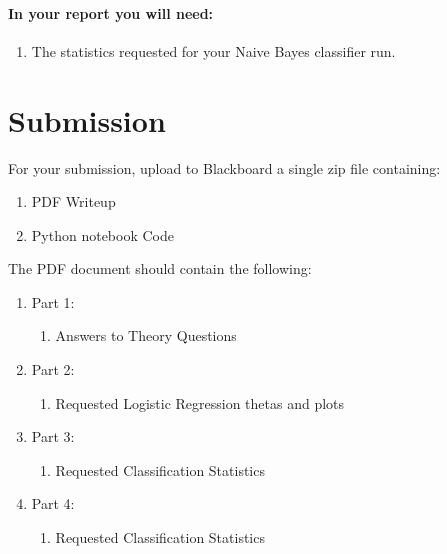\documentclass[12pt]{article}
\begin{document}
\paragraph{In your report you will need:}
\begin{enumerate}
\item The statistics requested for your Naive Bayes classifier run.
\end{enumerate}

\newpage
\section*{Submission}
For your submission, upload to Blackboard a single zip file containing:

\begin{enumerate}
\item PDF Writeup
\item Python notebook Code
\end{enumerate}


\noindent
The PDF document should contain the following:

\begin{enumerate}
\item Part 1:
	\begin{enumerate}
	\item Answers to Theory Questions
	\end{enumerate}
\item Part 2:
	\begin{enumerate}
	\item Requested Logistic Regression thetas and plots
	\end{enumerate}
\item Part 3:
	\begin{enumerate}
	\item Requested Classification Statistics
	\end{enumerate}
\item Part 4:
	\begin{enumerate}
	\item Requested Classification Statistics
	\end{enumerate}
\end{enumerate}
\end{document}
